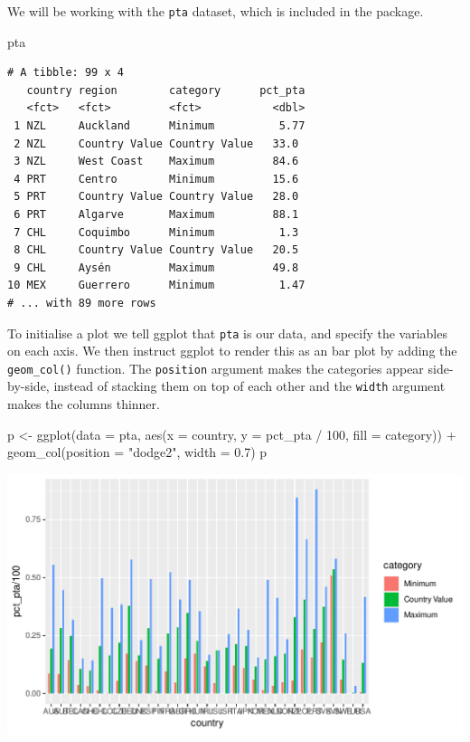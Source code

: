 \documentclass[
  11pt,
  oneside]{report}
\newenvironment{Shaded}{\begin{snugshade}}{\end{snugshade}}
\newcommand{\AttributeTok}[1]{\textcolor[rgb]{0.77,0.63,0.00}{#1}}
\newcommand{\DecValTok}[1]{\textcolor[rgb]{0.00,0.00,0.81}{#1}}
\newcommand{\FloatTok}[1]{\textcolor[rgb]{0.00,0.00,0.81}{#1}}
\newcommand{\FunctionTok}[1]{\textcolor[rgb]{0.00,0.00,0.00}{#1}}
\newcommand{\NormalTok}[1]{#1}
\newcommand{\OtherTok}[1]{\textcolor[rgb]{0.56,0.35,0.01}{#1}}
\newcommand{\SpecialCharTok}[1]{\textcolor[rgb]{0.00,0.00,0.00}{#1}}
\newcommand{\StringTok}[1]{\textcolor[rgb]{0.31,0.60,0.02}{#1}}
\begin{document}
We will be working with the \texttt{pta} dataset, which is included in
the package.

\begin{Shaded}
\begin{Highlighting}[]
\NormalTok{pta}
\end{Highlighting}
\end{Shaded}

\begin{verbatim}
# A tibble: 99 x 4
   country region        category      pct_pta
   <fct>   <fct>         <fct>           <dbl>
 1 NZL     Auckland      Minimum          5.77
 2 NZL     Country Value Country Value   33.0 
 3 NZL     West Coast    Maximum         84.6 
 4 PRT     Centro        Minimum         15.6 
 5 PRT     Country Value Country Value   28.0 
 6 PRT     Algarve       Maximum         88.1 
 7 CHL     Coquimbo      Minimum          1.3 
 8 CHL     Country Value Country Value   20.5 
 9 CHL     Aysén         Maximum         49.8 
10 MEX     Guerrero      Minimum          1.47
# ... with 89 more rows
\end{verbatim}

To initialise a plot we tell ggplot that \texttt{pta} is our data, and
specify the variables on each axis. We then instruct ggplot to render
this as an bar plot by adding the \texttt{geom\_col()} function. The
\texttt{position} argument makes the categories appear side-by-side,
instead of stacking them on top of each other and the \texttt{width}
argument makes the columns thinner.

\begin{Shaded}
\begin{Highlighting}[]
\NormalTok{p }\OtherTok{\textless{}{-}} \FunctionTok{ggplot}\NormalTok{(}\AttributeTok{data =}\NormalTok{ pta, }\FunctionTok{aes}\NormalTok{(}\AttributeTok{x =}\NormalTok{ country, }\AttributeTok{y =}\NormalTok{ pct\_pta }\SpecialCharTok{/} \DecValTok{100}\NormalTok{, }\AttributeTok{fill =}\NormalTok{ category)) }\SpecialCharTok{+}
  \FunctionTok{geom\_col}\NormalTok{(}\AttributeTok{position =} \StringTok{"dodge2"}\NormalTok{, }\AttributeTok{width =} \FloatTok{0.7}\NormalTok{)}
\NormalTok{p}
\end{Highlighting}
\end{Shaded}

\begin{center}\includegraphics{book_figures/bar_1-1} \end{center}
\end{document}
